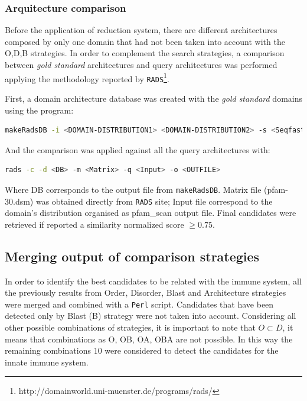 \documentclass[11pt]{article}
\begin{document}
\subsubsection*{\textbf{A}rquitecture comparison}
Before the application of reduction system, there are different 
architectures composed by only one domain that had not been taken into account 
with the O,D,B strategies. In order to complement the search strategies, a
comparison between \textsl{gold standard} architectures and query architectures 
was performed applying the methodology reported 
by \texttt{RADS}\footnote{http://domainworld.uni-muenster.de/programs/rads/}\cite{Terrapon:2014}.

First, a domain architecture database was created with the \textsl{gold standard} domains using the program:
\begin{lstlisting}[language=bash, breaklines=true]
makeRadsDB -i <DOMAIN-DISTRIBUTION1> <DOMAIN-DISTRIBUTION2> -s <Seqfasta1> <Seqfasta2> seqFile2.fa -o <OUT-DB>.
\end{lstlisting}

And the comparison was applied against all the query architectures with: 

\begin{lstlisting}[language=bash, breaklines=true]
rads -c -d <DB> -m <Matrix> -q <Input> -o <OUTFILE>
\end{lstlisting} 

Where DB corresponds to the output file from \texttt{makeRadsDB}. Matrix file 
(pfam-30.dsm) was obtained directly from \texttt{RADS} site; Input file 
correspond to the domain's distribution organised as pfam\_scan output 
file. Final candidates were retrieved if reported a similarity normalized score $\geq 0.75$.

\subsection*{Merging output of comparison strategies}
In order to identify the best candidates to be related with the immune 
system, all the previously results from Order, Disorder, Blast and Architecture 
strategies were merged and combined with a \texttt{Perl} script. Candidates 
that have been detected only by Blast (B) strategy were not taken into 
account. Considering all other possible combinations of strategies, it is 
important to note that $O \subset D$, it means that combinations as O, OB, OA, 
OBA are not possible. In this way the remaining combinations $10$ were 
considered to detect the candidates for the innate immune system.
\end{document}
